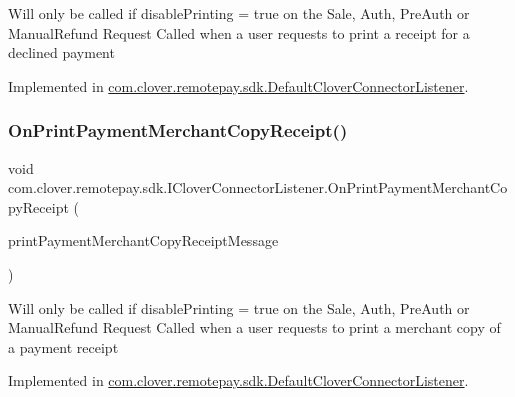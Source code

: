 Will only be called if disable\+Printing = true on the Sale, Auth, Pre\+Auth or Manual\+Refund Request Called when a user requests to print a receipt for a declined payment 



Implemented in \hyperlink{classcom_1_1clover_1_1remotepay_1_1sdk_1_1_default_clover_connector_listener_a5c37faa1b2fd5dfc6c5ea0aa85c32d50}{com.\+clover.\+remotepay.\+sdk.\+Default\+Clover\+Connector\+Listener}.

\mbox{\label{interfacecom_1_1clover_1_1remotepay_1_1sdk_1_1_i_clover_connector_listener_a487aca873c4e0bfa4222f9712f919efa}} 
\subsubsection{\texorpdfstring{On\+Print\+Payment\+Merchant\+Copy\+Receipt()}{OnPrintPaymentMerchantCopyReceipt()}}
{\footnotesize\ttfamily void com.\+clover.\+remotepay.\+sdk.\+I\+Clover\+Connector\+Listener.\+On\+Print\+Payment\+Merchant\+Copy\+Receipt (\begin{DoxyParamCaption}\item[{\hyperlink{classcom_1_1clover_1_1remotepay_1_1sdk_1_1_print_payment_merchant_copy_receipt_message}{Print\+Payment\+Merchant\+Copy\+Receipt\+Message}}]{print\+Payment\+Merchant\+Copy\+Receipt\+Message }\end{DoxyParamCaption})}



Will only be called if disable\+Printing = true on the Sale, Auth, Pre\+Auth or Manual\+Refund Request Called when a user requests to print a merchant copy of a payment receipt 



Implemented in \hyperlink{classcom_1_1clover_1_1remotepay_1_1sdk_1_1_default_clover_connector_listener_a308bf50f9fbf9bb6ec0955adde11a429}{com.\+clover.\+remotepay.\+sdk.\+Default\+Clover\+Connector\+Listener}.

